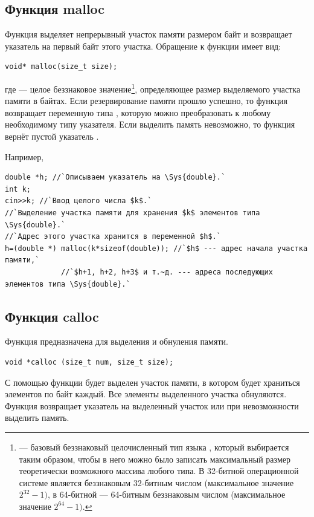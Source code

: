 \subsection[Функция malloc]{Функция malloc}
Функция  выделяет непрерывный участок памяти размером
 байт и возвращает указатель на первый байт этого участка. Обращение к функции имеет вид:

\begin{lstlisting}
void* malloc(size_t size);
\end{lstlisting}
где  --- целое беззнаковое значение\footnote{ --- базовый беззнаковый целочисленный тип языка
, который выбирается таким образом, чтобы в него можно было записать максимальный размер теоретически возможного
массива любого типа. В 32-битной операционной системе  является беззнаковым 32-битным числом (максимальное
значение  $2^{32}-1)$, в 64-битной --- 64-битным беззнаковым числом (максимальное значение  $2^{64}-1)$.}, определяющее
размер выделяемого участка памяти в байтах. Если резервирование памяти прошло успешно, то функция возвращает переменную
типа , которую можно преобразовать к любому необходимому типу указателя. Если выделить память
невозможно, то функция вернёт пустой указатель .

Например,
\begin{lstlisting}
double *h; //`Описываем указатель на \Sys{double}.`
int k;
cin>>k; //`Ввод целого числа $k$.`
//`Выделение участка памяти для хранения $k$ элементов типа \Sys{double}.` 
//`Адрес этого участка хранится в переменной $h$.`
h=(double *) malloc(k*sizeof(double)); //`$h$ --- адрес начала участка памяти,`
             //`$h+1, h+2, h+3$ и т.~д. --- адреса последующих элементов типа \Sys{double}.`
\end{lstlisting}

\subsection[Функция calloc]{Функция calloc}
Функция  предназначена для выделения и обнуления памяти. 
\begin{lstlisting}
void *calloc (size_t num, size_t size);
\end{lstlisting}

С помощью функции будет выделен участок памяти, в котором будет храниться  элементов по
 байт каждый. Все элементы выделенного участка обнуляются. Функция возвращает указатель
на выделенный участок или  при невозможности выделить память.

